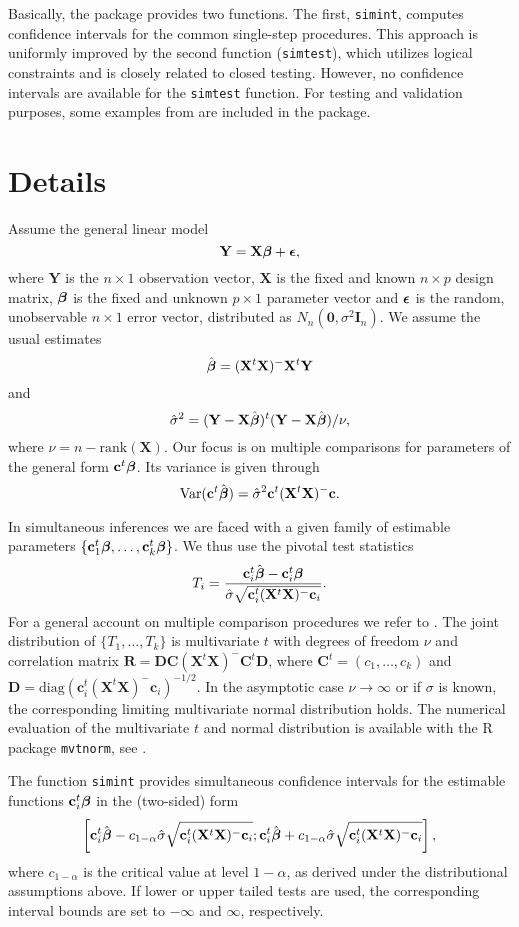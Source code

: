 \documentclass{article}
\newcommand{\bbeta}{\mbox{\boldmath $\beta$}}
\newcommand{\bepsilon}{\mbox{\boldmath $\epsilon$}}
\newcommand{\bc}{{\mathbf{c}}}
\newcommand{\bC}{{\mathbf{C}}}
\newcommand{\bD}{{\mathbf{D}}}
\newcommand{\bI}{{\mathbf{I}}}
\newcommand{\bR}{{\mathbf{R}}}
\newcommand{\bX}{{\mathbf{X}}}
\newcommand{\bY}{{\mathbf{Y}}}
\newcommand{\bzero}{{\mathbf{0}}}
\begin{document}
Basically, the package provides two functions. The first, \texttt{simint}, computes 
confidence
intervals for the common single-step procedures.
This approach is uniformly improved by the second function
(\texttt{simtest}), which utilizes logical constraints and is
closely related to closed testing. However, no confidence
intervals are available for the \texttt{simtest} function. 
For testing and validation purposes, some 
examples from \cite{multiple-c:1999} are included in the package.

\section{Details}

Assume the general linear model
$$
\bY = \bX \bbeta + \bepsilon,
$$
where $\bY$ is the $n \times 1$ observation vector, $\bX$ is the
fixed and known $n\times p$ design matrix, $\bbeta$ is the fixed
and unknown $p \times 1$ parameter vector and $\bepsilon$ is the
random, unobservable $n \times 1$ error vector, distributed as
$N_n(\bzero, \sigma^2\bI_n)$. We assume the usual estimates
$$
\hat{\bbeta} = (\bX^t \bX)^-\bX^t\bY
$$
and
$$
\hat{\sigma}^2 = (\bY-\bX\hat{\bbeta})^t(\bY-\bX\hat{\bbeta})/\nu,
$$
where $\nu = n - \mbox{rank}(\bX)$. Our focus is on multiple
comparisons for parameters of the general form $\bc^t \bbeta$.
Its variance is given through
$$
\mbox{Var}(\bc^t \hat{\bbeta}) = \hat{\sigma}^2\bc^t(\bX^t \bX)^-\bc.
$$

In simultaneous inferences we are faced with a given family of
estimable parameters $\{\bc_1^t \bbeta, \ldots, \bc_k^t \bbeta\}$.
We thus use the pivotal test statistics
$$
T_i = \frac{\bc_i^t \hat{\bbeta}-\bc_i^t
\bbeta}{\hat{\sigma}\sqrt{\bc_i^t(\bX^t \bX)^-\bc_i}}.
$$
For a general account on multiple comparison procedures we refer
to \cite{HochbergTamhane:1987}. The joint distribution of $\{T_1,
\ldots, T_k\}$ is multivariate $t$ with degrees of freedom $\nu$
and correlation matrix $\bR = \bD\bC(\bX^t \bX)^-\bC^t\bD$, where
$\bC^t = (c_1, \ldots, c_k)$ and $\bD = \mbox{diag}(\bc_i^t(\bX^t
\bX)^-\bc_i)^{-1/2}$. In the asymptotic case $\nu \rightarrow
\infty$ or if $\sigma$ is known, the corresponding limiting
multivariate normal distribution holds. The numerical evaluation
of the multivariate $t$ and normal distribution is available with
the \textsf{R} package \texttt{mvtnorm}, see \cite{hothornetal:2001}.

The function \texttt{simint} provides simultaneous confidence
intervals for the estimable functions $\bc_i^t \bbeta$ in the
(two-sided) form
$$
\left[ \bc_i^t \hat{\bbeta}-c_{1-\alpha}\hat{\sigma}\sqrt{\bc_i^t(\bX^t
\bX)^-\bc_i};
\bc_i^t \hat{\bbeta}+c_{1-\alpha}\hat{\sigma}\sqrt{\bc_i^t(\bX^t
\bX)^-\bc_i} \right],
$$
where $c_{1-\alpha}$ is the critical value at level $1-\alpha$, as
derived under the distributional assumptions above. If lower or
upper tailed tests are used, the corresponding interval bounds are
set to $-\infty$ and $\infty$, respectively.
\end{document}
